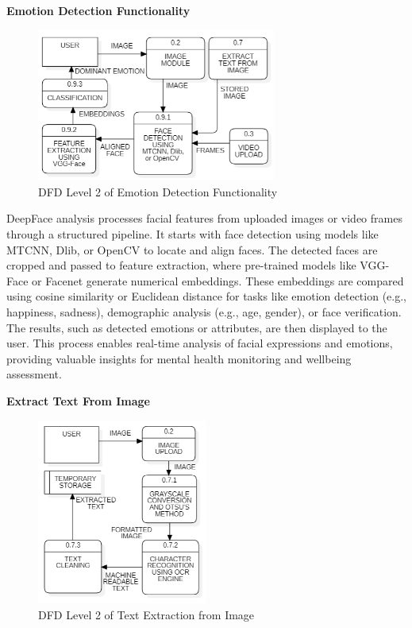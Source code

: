 \vspace{2em}

\noindent
\textbf{Emotion Detection Functionality}

\begin{figure}[h!]  
    \centering
    \includegraphics[width=0.7\textwidth]{Images/DFD L2 EMOTION.png}  
    \caption{DFD Level 2 of Emotion Detection Functionality}
    \label{dfdl14456}  %
\end{figure}

\noindent
DeepFace analysis processes facial features from uploaded images or video frames through a structured pipeline. It starts with face detection using models like MTCNN, Dlib, or OpenCV to locate and align faces. The detected faces are cropped and passed to feature extraction, where pre-trained models like VGG-Face or Facenet generate numerical embeddings. These embeddings are compared using cosine similarity or Euclidean distance for tasks like emotion detection (e.g., happiness, sadness), demographic analysis (e.g., age, gender), or face verification. The results, such as detected emotions or attributes, are then displayed to the user. This process enables real-time analysis of facial expressions and emotions, providing valuable insights for mental health monitoring and wellbeing assessment.

\pagebreak

\noindent
\textbf{Extract Text From Image}

\begin{figure}[h!]  
    \centering
    \includegraphics[width=0.5\textwidth]{Images/DFD L2 TEXT EXTRACT.png}  
    \caption{DFD Level 2 of Text Extraction from Image}
    \label{dfdl13456}  %
\end{figure}

